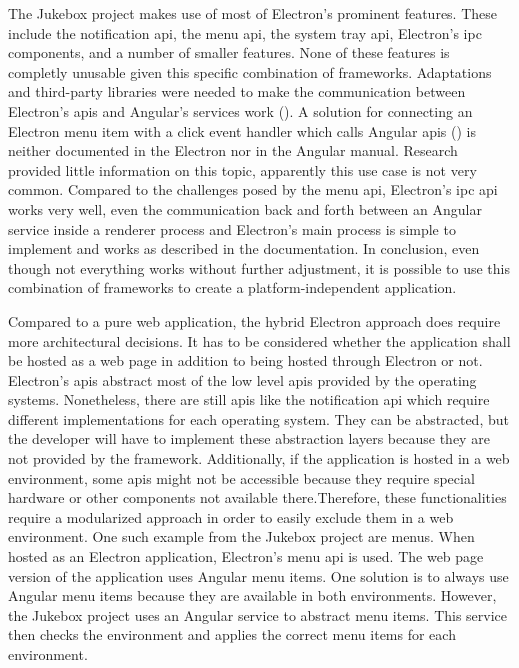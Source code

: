 


The Jukebox project makes use of most of Electron's prominent features. These include the notification \gls{api}, the menu \gls{api}, the system tray \gls{api}, Electron's \gls{ipc} components, and a number of smaller features. None of these features is completly unusable given this specific combination of frameworks. Adaptations and third-party libraries were needed to make the communication between Electron's \glspl{api} and Angular's services work (). A solution for connecting an Electron menu item with a click event handler which calls Angular \glspl{api} () is neither documented in the Electron nor in the Angular manual. Research provided little information on this topic, apparently this use case is not very common. Compared to the challenges posed by the menu \gls{api}, Electron's \gls{ipc} \gls{api} works very well, even the communication back and forth between an Angular service inside a renderer process and Electron's main process is simple to implement and works as described in the documentation. In conclusion, even though not everything works without further adjustment, it is possible to use this combination of frameworks to create a platform-independent application.


Compared to a pure web application, the hybrid Electron approach does require more architectural decisions. It has to be considered whether the application shall be hosted as a web page in addition to being hosted through Electron or not. Electron's \glspl{api} abstract most of the low level \glspl{api} provided by the operating systems. Nonetheless, there are still \glspl{api} like the notification \gls{api} which require different implementations for each operating system. They can be abstracted, but the developer will have to implement these abstraction layers because they are not provided by the framework. Additionally, if the application is hosted in a web environment, some \glspl{api} might not be accessible because they require special hardware or other components not available there.Therefore, these functionalities require a modularized approach in order to easily exclude them in a web environment. One such example from the Jukebox project are menus. When hosted as an Electron application, Electron's menu \gls{api} is used. The web page version of the application uses Angular menu items. One solution is to always use Angular menu items because they are available in both environments. However, the Jukebox project uses an Angular service to abstract menu items. This service then checks the environment and applies the correct menu items for each environment.

